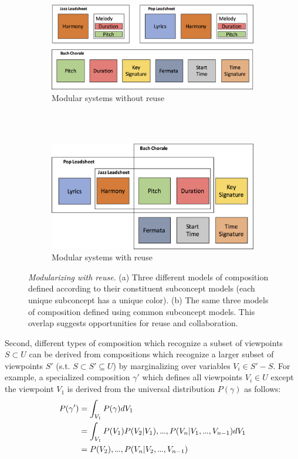 \documentclass[letterpaper]{article}
\newcommand\mydots{\hbox to .75em{.\hss.\hss.}}
\begin{document}
\begin{figure}[th]
    \centering
    \begin{subfigure}[b]{.5\textwidth}
        \includegraphics[width=\textwidth]{unoverlapping_models}
        \caption{Modular systems without reuse}
        \label{fig:unoverlapping}
    \end{subfigure}
    \\~\\ %
    \begin{subfigure}[b]{.5\textwidth}
        \includegraphics[width=\textwidth]{overlapping_models}
        \caption{Modular systems with reuse}
        \label{fig:overlapping}
    \end{subfigure}
    \caption{\emph{Modularizing with reuse}. (a) Three different models of composition defined according to their constituent subconcept models (each unique subconcept has a unique color). (b) The same three models of composition defined using common subconcept models. This overlap suggests opportunities for reuse and collaboration.}\label{fig:modularization}
\end{figure}

Second, different types of composition which recognize a subset of viewpoints $S \subset U$ can be derived from compositions which recognize a larger subset of viewpoints $S'$ (s.t. $S \subset S' \subseteq U$) by marginalizing over variables $V_i \in S'-S$. For example, a specialized composition $\gamma'$ which defines all viewpoints $V_i \in U$ except the viewpoint $V_1$ is derived from the universal distribution $P(\gamma)$ as follows:
\begin{align*}
P(\gamma') &= \int_{V_1} P(\gamma) dV_1\\ 
&= \int_{V_1} P(V_1) P(V_2|V_1), \mydots, P(V_n|V_1,\mydots,V_{n-1}) dV_1\\ 
&= P(V_2), \mydots, P(V_n|V_2,\mydots,V_{n-1})
\end{align*}
\end{document}
